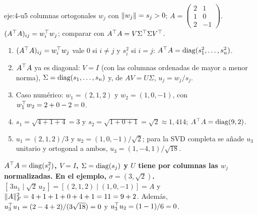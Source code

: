 \begin{solucion}{eje:4-u5}
\datos columnas ortogonales $w_j$ con $\lVert w_j\rVert=s_j>0$; $A=\begin{pmatrix}2&1\\1&0\\2&-1\end{pmatrix}$.
\planteamiento $(A^{\top} A)_{ij}=w_i^{\top} w_j$; comparar con $A^{\top} A=V\Sigma^{\top}\Sigma V^{\top}$.
\pasos
\begin{enumerate}[label=\arabic*.]
  \item $(A^{\top} A)_{ij}=w_i^{\top} w_j$ vale $0$ si $i\ne j$ y $s_i^{2}$ si $i=j$: $A^{\top} A=\operatorname{diag}(s_1^{2},\dots,s_n^{2})$.
  \item $A^{\top} A$ ya es diagonal: $V=I$ (con las columnas ordenadas de mayor a menor norma), $\Sigma=\operatorname{diag}(s_1,\dots,s_n)$ y, de $AV=U\Sigma$, $u_j=w_j/s_j$.
  \item Caso numérico: $w_1=(2,1,2)$ y $w_2=(1,0,-1)$, con $w_1^{\top} w_2=2+0-2=0$.
  \item $s_1=\sqrt{4+1+4}=3$ y $s_2=\sqrt{1+0+1}=\sqrt{2}\approx 1{,}414$; $A^{\top} A=\operatorname{diag}(9,2)$.
  \item $u_1=(2,1,2)/3$ y $u_2=(1,0,-1)/\sqrt{2}$; para la SVD completa se añade $u_3$ unitario y ortogonal a ambos, $u_3=(1,-4,1)/\sqrt{18}$.
\end{enumerate}
\resultado \textbf{$A^{\top} A=\operatorname{diag}(s_j^{2})$, $V=I$, $\Sigma=\operatorname{diag}(s_j)$ y $U$ tiene por columnas las $w_j$ normalizadas. En el ejemplo, $\sigma=(3,\sqrt{2})$.}
\comprobacion $[\,3u_1\mid\sqrt{2}\,u_2\,]=[(2,1,2)\mid(1,0,-1)]=A$ y $\lVert A\rVert_F^{2}=4+1+1+0+4+1=11=9+2$. Además, $u_3^{\top} u_1=(2-4+2)/(3\sqrt{18})=0$ y $u_3^{\top} u_2=(1-1)/6=0$.
\end{solucion}

